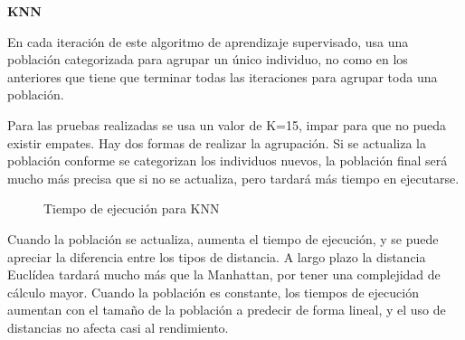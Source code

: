 \textbf{KNN}

En cada iteración de este algoritmo de aprendizaje supervisado, usa una población categorizada para agrupar un único individuo, no como en los anteriores que tiene que terminar todas las iteraciones para agrupar toda una población.

Para las pruebas realizadas se usa un valor de K=15, impar para que no pueda existir empates. Hay dos formas de realizar la agrupación. Si se actualiza la población conforme se categorizan los individuos nuevos, la población final será mucho más precisa que si no se actualiza, pero tardará más tiempo en ejecutarse. 


\begin{figure}[h!]
	\centering
	\caption{Tiempo de ejecución para KNN}
\end{figure}

Cuando la población se actualiza, aumenta el tiempo de ejecución, y se puede apreciar la diferencia entre los tipos de distancia. A largo plazo la distancia Euclídea tardará mucho más que la Manhattan, por tener una complejidad de cálculo mayor. 
Cuando la población es constante, los tiempos de ejecución aumentan con el tamaño de la población a predecir de forma lineal, y el uso de distancias no afecta casi al rendimiento.


